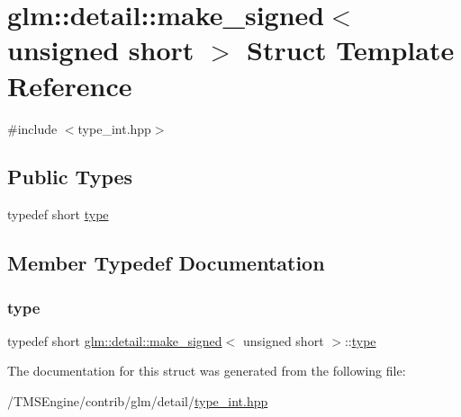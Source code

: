 \hypertarget{structglm_1_1detail_1_1make__signed_3_01unsigned_01short_01_4}{}\section{glm\+:\+:detail\+:\+:make\+\_\+signed$<$ unsigned short $>$ Struct Template Reference}
\label{structglm_1_1detail_1_1make__signed_3_01unsigned_01short_01_4}


{\ttfamily \#include $<$type\+\_\+int.\+hpp$>$}

\subsection*{Public Types}
\begin{DoxyCompactItemize}
\item 
typedef short \hyperlink{structglm_1_1detail_1_1make__signed_3_01unsigned_01short_01_4_af5793ac48501a8fb2be1d5aa55afff67}{type}
\end{DoxyCompactItemize}


\subsection{Member Typedef Documentation}
\mbox{\label{structglm_1_1detail_1_1make__signed_3_01unsigned_01short_01_4_af5793ac48501a8fb2be1d5aa55afff67}} 
\subsubsection{\texorpdfstring{type}{type}}
{\footnotesize\ttfamily typedef short \hyperlink{structglm_1_1detail_1_1make__signed}{glm\+::detail\+::make\+\_\+signed}$<$ unsigned short $>$\+::\hyperlink{structglm_1_1detail_1_1make__signed_3_01unsigned_01short_01_4_af5793ac48501a8fb2be1d5aa55afff67}{type}}



The documentation for this struct was generated from the following file\+:\begin{DoxyCompactItemize}
\item 
/\+T\+M\+S\+Engine/contrib/glm/detail/\hyperlink{type__int_8hpp}{type\+\_\+int.\+hpp}\end{DoxyCompactItemize}
